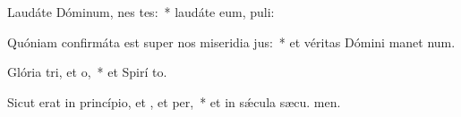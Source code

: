 \item Laudáte Dóminum, nes tes:~* laudáte eum,  puli:
\item Quóniam confirmáta est super nos miseridia jus:~* et véritas Dómini manet  num.
\item Glória tri, et o,~* et Spirí to.
\item Sicut erat in princípio, et , et per,~* et in sǽcula sæcu. men.
